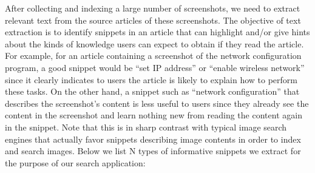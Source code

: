 \documentclass{www2010-submission}
\begin{document}
After collecting and indexing a large number of screenshots, we need
to extract relevant text from the source articles of these
screenshots. The objective of text extraction is to identify snippets
in an article that can highlight and/or give hints about the kinds of
knowledge users can expect to obtain if they read the article. For
example, for an article containing a screenshot of the network
configuration program, a good snippet would be ``set IP address'' or
``enable wireless network'' since it clearly indicates to users the
article is likely to explain how to perform these tasks. On the other
hand, a snippet such as ``network configuration'' that describes the
screenshot's content is less useful to users since they already see
the content in the screenshot and learn nothing new from reading the
content again in the snippet. Note that this is in sharp contrast with
typical image search engines that actually favor snippets describing
image contents in order to index and search images. Below we list N
types of informative snippets we extract for the purpose of our 
search application:
\end{document}
